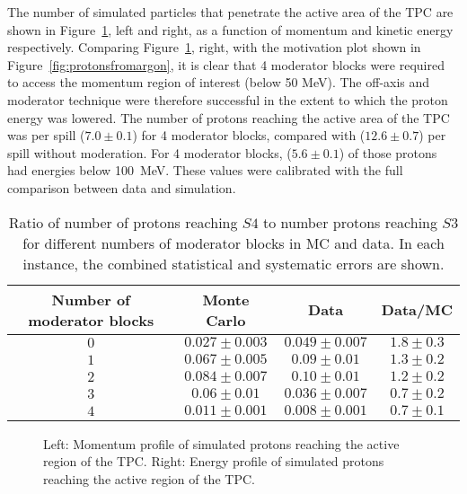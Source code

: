The number of simulated particles that penetrate the active area of the TPC are shown in Figure~\ref{fig:MCTPC}, left and right, as a function of momentum and kinetic energy respectively.
Comparing Figure~\ref{fig:MCTPC}, right, with the motivation plot shown in Figure~\ref{fig:protonsfromargon}, it is clear that 4 moderator blocks were required to access the momentum region of interest (below 50 MeV).
The off-axis and moderator technique were therefore successful in the extent to which the proton energy was lowered.
The number of protons reaching the active area of the TPC was  per spill ($7.0 \pm  0.1$) for 4 moderator blocks, compared with ($12.6 \pm 0.7$) per spill without moderation. 
For 4 moderator blocks, ($5.6 \pm  0.1$) of those protons had energies below 100~MeV.
These values were calibrated with the full comparison between data and simulation.

\begin{table}
  \centering
  \caption{Ratio of number of protons reaching $\mathit{S4}$ to number protons reaching $\mathit{S3}$ for different numbers of moderator blocks in MC and data. In each instance, the combined statistical and systematic errors are shown.}
  \begin{tabular}{c|c c c}
    \hline
    \hline
    Number of moderator blocks & Monte Carlo & Data & Data/MC\\
    \hline
    $0$ & $0.027 \pm 0.003$ & $0.049 \pm 0.007$ & $1.8 \pm 0.3$ \\
    $1$ & $0.067 \pm 0.005$ & $0.09 \pm 0.01$ & $1.3 \pm 0.2$ \\
    $2$ & $0.084 \pm 0.007$ & $0.10 \pm 0.01$ & $1.2 \pm 0.2$ \\
    $3$ & $0.06 \pm 0.01$ & $0.036 \pm 0.007$ & $0.7 \pm 0.2$ \\
    $4$ & $0.011 \pm 0.001$ & $0.008 \pm 0.001$ & $0.7 \pm 0.1$ \\
    \hline
  \end{tabular}
  \label{tab:ratios}
\end{table}

\begin{figure}[!ht]
  \begin{minipage}[t]{0.48\textwidth}
    \begin{adjustbox}{max totalsize={\textwidth}{.35\textheight}, center}
      
    \end{adjustbox}
  \end{minipage}
  \hspace{0.3cm}
  \begin{minipage}[t]{0.48\textwidth}
    \begin{adjustbox}{max totalsize={\textwidth}{.35\textheight}, center}
      
    \end{adjustbox}
    
  \end{minipage}
  \caption{Left: Momentum profile of simulated protons reaching the active region of the TPC. Right: Energy profile of simulated protons reaching the active region of the TPC.}
  \label{fig:MCTPC}	
\end{figure}
    
